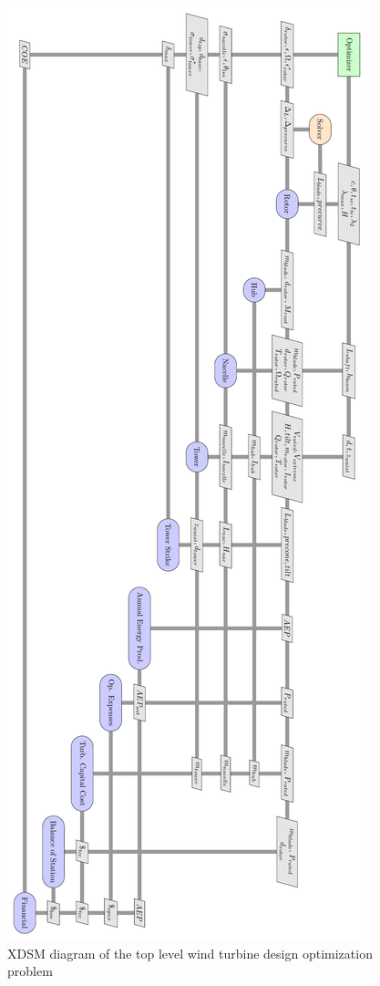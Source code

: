 \documentclass[]{aiaa-tc} %
\begin{document}
    \begin{figure}[!p]
        \centering
        \includegraphics[height=\textheight]{xdsm/wt_xdsm}
        \caption{XDSM diagram of the top level wind turbine design optimization problem}
        \label{fig:xdsm_wt}
    \end{figure}
\end{document}
